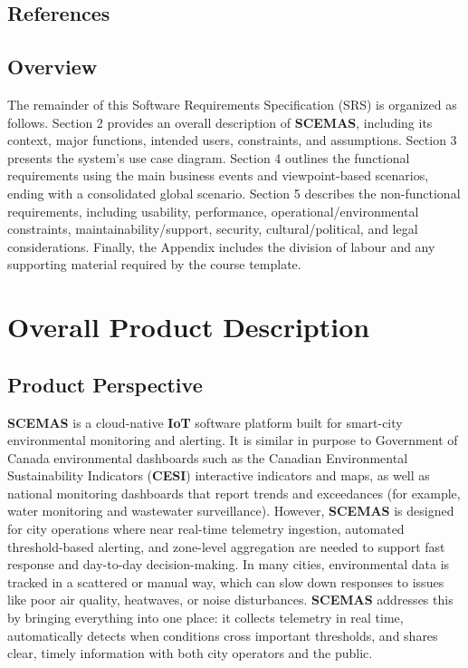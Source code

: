 \documentclass[]{article}
\begin{document}
\subsection{References}
\label{sub:references}

\renewcommand{\refname}{} %
\vspace{-2.5em}



\subsection{Overview}
\label{sub:overview}
The remainder of this Software Requirements Specification (SRS) is organized as follows. Section 2 provides an overall description of \textbf{SCEMAS}, including its context, major functions, intended users, constraints, and assumptions. Section 3 presents the system's use case diagram. Section 4 outlines the functional requirements using the main business events and viewpoint-based scenarios, ending with a consolidated global scenario. Section 5 describes the non-functional requirements, including usability, performance, operational/environmental constraints, maintainability/support, security, cultural/political, and legal considerations. Finally, the Appendix includes the division of labour and any supporting material required by the course template.


\section{Overall Product Description}
\label{sec:overall_description}

\subsection{Product Perspective}
\label{sub:product_perspective}

\textbf{SCEMAS} is a cloud-native \textbf{IoT} software platform built for smart-city environmental monitoring and alerting. It is similar in purpose to Government of Canada environmental dashboards such as the Canadian Environmental Sustainability Indicators (\textbf{CESI}) \cite{cesi} interactive indicators and maps, as well as national monitoring dashboards that report trends and exceedances (for example, water monitoring and wastewater surveillance). However, \textbf{SCEMAS} is designed for city operations where near real-time telemetry ingestion, automated threshold-based alerting, and zone-level aggregation are needed to support fast response and day-to-day decision-making. In many cities, environmental data is tracked in a scattered or manual way, which can slow down responses to issues like poor air quality, heatwaves, or noise disturbances. \textbf{SCEMAS} addresses this by bringing everything into one place: it collects telemetry in real time, automatically detects when conditions cross important thresholds, and shares clear, timely information with both city operators and the public.
\end{document}
